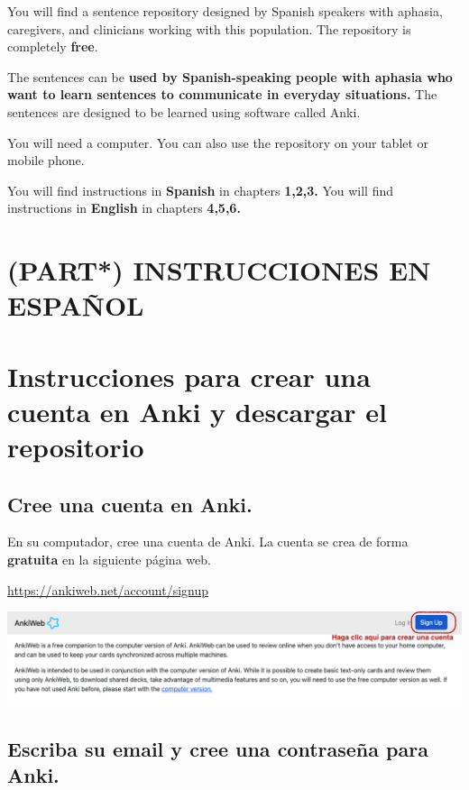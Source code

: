 \documentclass[
]{book}
\begin{document}
You will find a sentence repository designed by Spanish speakers with aphasia, caregivers, and clinicians working with this population. The repository is completely \textbf{free}.

The sentences can be \textbf{used by Spanish-speaking people with aphasia who want to learn sentences to communicate in everyday situations.} The sentences are designed to be learned using software called Anki.

You will need a computer. You can also use the repository on your tablet or mobile phone.

You will find instructions in \textbf{Spanish} in chapters \textbf{1,2,3.}
You will find instructions in \textbf{English} in chapters \textbf{4,5,6.}

\hypertarget{part-instrucciones-en-espauxf1ol}{%
\chapter*{\texorpdfstring{(PART*) \textbf{INSTRUCCIONES EN ESPAÑOL}}{(PART*) INSTRUCCIONES EN ESPAÑOL}}\label{part-instrucciones-en-espauxf1ol}}

\hypertarget{cross_0}{%
\chapter{Instrucciones para crear una cuenta en Anki y descargar el repositorio}\label{cross_0}}

\hypertarget{cree-una-cuenta-en-anki.}{%
\section{Cree una cuenta en Anki.}\label{cree-una-cuenta-en-anki.}}

En su computador, cree una cuenta de Anki. La cuenta se crea de forma \textbf{gratuita} en la siguiente página web.

\url{https://ankiweb.net/account/signup}

\includegraphics[width=0.9\linewidth]{images/reposit_sp/sign_up}

\hypertarget{cross_1}{%
\section{Escriba su email y cree una contraseña para Anki.}\label{cross_1}}
\end{document}
